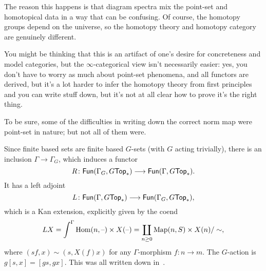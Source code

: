 The reason this happens is that diagram spectra mix the point-set and homotopical data in a way that can be
confusing. Of course, the homotopy groups depend on the universe, so the homotopy theory and homotopy category are
genuinely different.
\begin{rem}
You might be thinking that this is an artifact of one's desire for concreteness and model categories, but the
$\infty$-categorical view isn't necessarily easier: yes, you don't have to worry as much about point-set phenomena,
and all functors are derived, but it's a lot harder to infer the homotopy theory from first principles and you can
write stuff down, but it's not at all clear how to prove it's the right thing.

To be sure, some of the difficulties in writing down the correct norm map were point-set in nature; but not all of
them were.
\end{rem}
Since finite based sets are finite based $G$-sets (with $G$ acting trivially), there is an inclusion
$\Gamma\to\Gamma_G$, which induces a functor
\[R\colon\mathsf{Fun}(\Gamma_G, G\mathsf{Top}_*)\longrightarrow\mathsf{Fun}(\Gamma, G\mathsf{Top}_*).\]
It has a left adjoint
\[L\colon\mathsf{Fun}(\Gamma, G\mathsf{Top}_*)\longrightarrow\mathsf{Fun}(\Gamma_G, G\mathsf{Top}_*),\]
which is a Kan extension, explicitly given by the coend
\[LX = \int^\Gamma \operatorname{Hom}(n, \text{--})\times X(\text{--}) = \coprod_{n\ge 0} \operatorname{Map}(n, S)\times X(n)/\sim,\]
where $(sf, x)\sim (s, X(f)x)$ for any $\Gamma$-morphism $f\colon n\to m$. The $G$-action is $g[s,x] = [gs,gx]$.
This was all written down in~\cite{Shimakawa91}.


